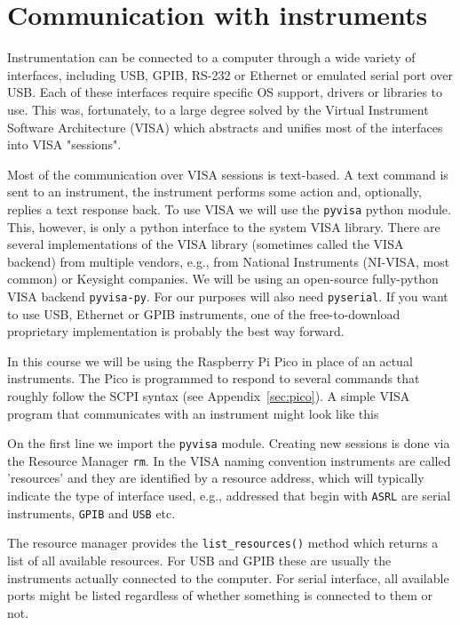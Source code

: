 \newpage
\section{Communication with instruments}
Instrumentation can be connected to a computer through a wide variety of interfaces, including USB, GPIB, RS-232 or Ethernet or emulated serial port over USB. Each of these interfaces require specific OS support, drivers or libraries to use. This was, fortunately, to a large degree solved by the Virtual Instrument Software Architecture (VISA) which abstracts and unifies most of the interfaces into VISA "sessions".

Most of the communication over VISA sessions is text-based. A text command is sent to an instrument, the instrument performs some action and, optionally, replies a text response back. To use VISA we will use the \lstinline|pyvisa| python module. This, however, is only a python interface to the system VISA library. There are several implementations of the VISA library (sometimes called the VISA backend) from multiple vendors, e.g., from National Instruments (NI-VISA, most common) or Keysight companies. We will be using an open-source fully-python VISA backend \lstinline|pyvisa-py|. For our purposes will also need \lstinline|pyserial|. If you want to use USB, Ethernet or GPIB instruments, one of the free-to-download proprietary implementation is probably the best way forward.

In this course we will be using the Raspberry Pi Pico in place of an actual instruments. The Pico is programmed to respond to several commands that roughly follow the SCPI syntax (see Appendix~\ref{sec:pico}). A simple VISA program that communicates with an instrument might look like this

On the first line we import the \lstinline|pyvisa| module. Creating new sessions is done via the Resource Manager \lstinline|rm|. In the VISA naming convention instruments are called 'resources' and they are identified by a resource address, which will typically indicate the type of interface used, e.g., addressed that begin with \lstinline|ASRL| are serial instruments, \lstinline|GPIB| and \lstinline|USB| etc.

The resource manager provides the \lstinline|list_resources()| method which returns a list of all available resources. For USB and GPIB these are usually the instruments actually connected to the computer. For serial interface, all available ports might be listed regardless of whether something is connected to them or not.

